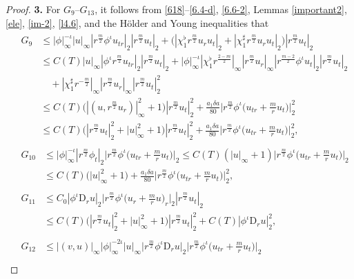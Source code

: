 \documentclass[11pt,reqno]{amsart}
\numberwithin{rk}{section}
\numberwithin{prop}{section}
\numberwithin{mydef}{section}
\numberwithin{lem}{section}
\numberwithin{equation}{section}
\numberwithin{thm}{section}
\begin{document}
\begin{proof}
\smallskip
\textbf{3.} For $G_{9}$--$G_{13}$, it follows from \eqref{618}--\eqref{6.4-d}, \eqref{6.6-2}, Lemmas \ref{important2}, \ref{ele}, \ref{im-2}, \ref{l4.6}, and the H\"older and Young inequalities that
\begin{align*}
&\begin{aligned}
G_{9}&\leq |\phi|_\infty^{-\iota}|u|_{\infty}|r^{\frac{m}{2}}\phi^\iota u_{tr}|_2|r^{\frac{m}{2}}u_t|_2+ \big(|\chi_1^\flat r^\frac{m}{2} u_ru_t|_{2} +  |\chi_1^\sharp r^\frac{m}{2} u_ru_t|_{2}\big) |r^{\frac{m}{2}}u_t|_2\\
&\leq C(T)|u|_{\infty}|\phi^\iota r^{\frac{m}{2}}u_{tr}|_2|r^{\frac{m}{2}}u_t|_2+|\phi|_\infty^{-\iota} |\chi_1^\flat r^\frac{2-m}{2}|_\infty|r^\frac{m}{2} u_r|_{\infty} |r^{\frac{m-2}{2}}\phi^\iota u_t|_2 |r^{\frac{m}{2}}u_t|_2\\
&\quad +  |\chi_1^\sharp r^{-\frac{m}{2}}|_\infty |r^\frac{m}{2}u_r|_{\infty}|r^{\frac{m}{2}}u_t|_2^2\\
&\leq C(T)\big(|(u,r^\frac{m}{2}u_r)|_\infty^2+1\big)|r^{\frac{m}{2}}u_t|_2^2 +\frac{a_1\delta a}{80}\Big|r^{\frac{m}{2}}\phi^\iota\big(u_{tr}+\frac{m}{r}u_t\big)\Big|_2^2\\
&\leq C(T)\big(|r^{\frac{m}{2}}u_t|_2^2+|u|_\infty^2+1\big)|r^{\frac{m}{2}}u_t|_2^2 +\frac{a_1\delta a}{80}\Big|r^{\frac{m}{2}}\phi^\iota\big(u_{tr}+\frac{m}{r}u_t\big)\Big|_2^2,
\end{aligned}\\
&\begin{aligned}
G_{10}&\leq |\phi|_\infty^{-\iota}|r^{\frac{m}{2}}\phi_t|_2 \Big|r^{\frac{m}{2}}\phi^\iota\big(u_{tr}+\frac{m}{r}u_t\big)\Big|_2\leq C(T)(|u|_\infty+1)\Big|r^{\frac{m}{2}}\phi^\iota\big(u_{tr}+\frac{m}{r}u_t\big)\Big|_2\\
&\leq C(T)\big(|u|_\infty^2+1\big) +\frac{a_1\delta a}{80}\Big|r^{\frac{m}{2}}\phi^\iota\big(u_{tr}+\frac{m}{r}u_t\big)\Big|_2^2,
\end{aligned}\\
&\begin{aligned}
G_{11}&\leq C_0 |\phi^\iota\mathrm{D}_r u|_2\Big|r^\frac{m}{2}\phi^\iota\big(u_r+\frac{m}{r}u\big)_r\Big|_2|r^\frac{m}{2}u_t|_2\\
&\leq C(T)\big(|r^\frac{m}{2}u_t|_2^2+|u|_\infty^2+1\big)|r^\frac{m}{2}u_t|_2^2+C(T) |\phi^\iota \mathrm{D}_r u|_2^2,
\end{aligned}\\
&\begin{aligned}
G_{12}&\leq |(v,u)|_\infty |\phi|_\infty^{-2\iota}|u|_\infty\Big|r^\frac{m}{2}\phi^\iota\mathrm{D}_r u\Big|_2\Big|r^\frac{m}{2}\phi^\iota\big(u_{tr}+\frac{m}{r}u_t\big)\Big|_2\\

\end{aligned}
\end{align*}
\end{proof}
\end{document}
